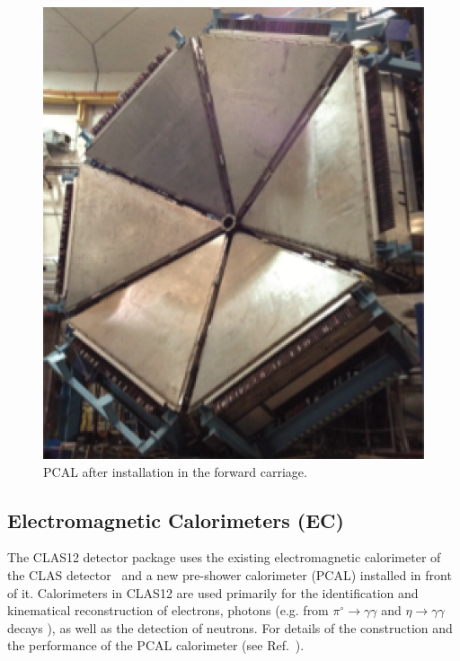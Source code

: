 \documentclass[final,3p,times,twocolumn,authoryear]{elsarticle}
\begin{document}
\begin{figure}[htbp!]
\centerline{\includegraphics[width=0.95\columnwidth]{PCAL.png}}
\caption{PCAL after installation in the forward carriage. }
\label{ec-pcal}
\end{figure}
\subsection{\rm Electromagnetic Calorimeters (EC) }
The CLAS12 detector package uses the existing electromagnetic calorimeter of the CLAS 
detector~\cite{Amarian:2001zs} and a new pre-shower calorimeter (PCAL) installed in front of it. Calorimeters in 
CLAS12 are used primarily for the identification and kinematical reconstruction of electrons, photons 
(e.g. from $\pi^\circ \to \gamma \gamma$ and $\eta \to \gamma  \gamma$ decays ), as well as the detection of 
neutrons. For details of the construction and the performance of the PCAL calorimeter (see Ref.~\cite{PCAL}). 
\end{document}
